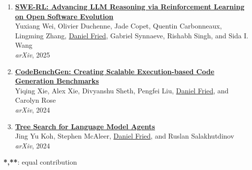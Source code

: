\begin{enumerate}[leftmargin=-1mm,partopsep=0pt]
\item \href{https://arxiv.org/abs/2502.18449}{\textbf{SWE-RL: Advancing LLM Reasoning via Reinforcement Learning on Open Software Evolution}} \\
  Yuxiang Wei, Olivier Duchenne, Jade Copet, Quentin Carbonneaux, Lingming Zhang, \underline{Daniel Fried}, Gabriel Synnaeve, Rishabh Singh, and Sida I. Wang\\
  \emph{arXiv}, 2025

\item \href{https://arxiv.org/abs/2404.00566}{\textbf{CodeBenchGen: Creating Scalable Execution-based Code Generation Benchmarks}} \\
  Yiqing Xie, Alex Xie, Divyanshu Sheth, Pengfei Liu, \underline{Daniel Fried}, and Carolyn Rose\\
  \emph{arXiv}, 2024

\item \href{https://arxiv.org/abs/2407.01476}{\textbf{Tree Search for Language Model Agents}} \\
  Jing Yu Koh, Stephen McAleer, \underline{Daniel Fried}, and Ruslan Salakhutdinov\\
  \emph{arXiv}, 2024

\end{enumerate}

\textbf{*,**}: equal contribution
